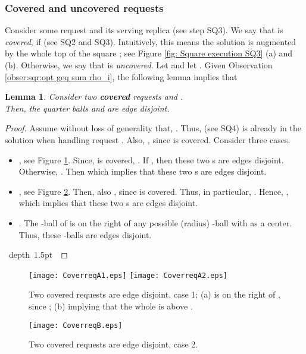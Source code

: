 \documentclass[11pt]{article}
\newtheorem{lem}[theorem]{Lemma}
\def\blackslug{\hbox{\hskip 1pt \vrule width 4pt height 8pt
    depth 1.5pt \hskip 1pt}}
\def\QED{\quad\blackslug\lower 8.5pt\null\par}
\begin{document}
\subsubsection{Covered and uncovered requests}
Consider some request  and its serving replica 
(see step SQ3).
We say that   is {\em covered}, if  (see SQ2 and SQ3).
Intuitively, this means the solution  is augmented by the whole top of the square ; see Figure \ref{fig: Square execution SQ3} (a) and (b).
Otherwise, we say that  is {\em uncovered}.
Let  and let .
Given Observation \ref{obser:sqr:opt geq sum rho_i},
the following lemma implies that





\begin{lem}
Consider two {\bf covered} requests  and .\\
Then, the  quarter balls
 and 
are edge disjoint.
\label{lem:Square: covered requests are edges disjoint}
\end{lem}

\begin{proof}
Assume without loss of generality that, .
Thus,  (see SQ4) is already in the solution when handling request .
Also, , since  is covered.
Consider three cases.


\begin{itemize}
\item[{\bf Case 1.}]
  , see Figure \ref{fig:Square: covered requests case 1}.
Since,  is covered, .
If , then these two s are edges disjoint.
Otherwise, .
Then  which implies that these two s are edges disjoint.


\item[{\bf Case 2.}] , see Figure \ref{fig:Square: covered requests case 2}.
Then, also , since  is covered.
Thus, in particular, .
Hence, , which implies that these two s are edges disjoint.


\item[{\bf Case 3.}] .
The -ball of  is on the right of any possible (radius) -ball with  as a center.
Thus, these -balls are edges disjoint.

\end{itemize}
\QED
\end{proof}



\begin{figure}[ht]
\begin{center}
\texttt{[image: CoverreqA1.eps]}
\hfill
\texttt{[image: CoverreqA2.eps]}
\end{center}
\caption{\sf Two covered requests are edge disjoint, case 1; (a)  is on the right of , since ;
(b)  implying that the whole  is above .
\label{fig:Square: covered requests case 1}
}
\end{figure}
\begin{figure}[ht]
\begin{center}
\texttt{[image: CoverreqB.eps]}
\end{center}
\caption{\sf
Two covered requests are edge disjoint, case 2.
\label{fig:Square: covered requests case 2}
}
\end{figure}
\end{document}
